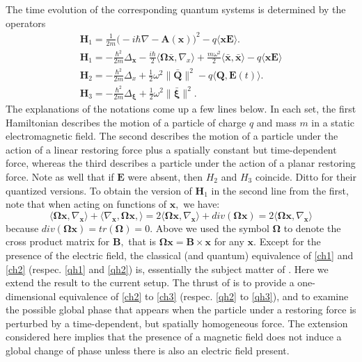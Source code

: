 \documentclass[12pt]{article}
\numberwithin{equation}{section}
\newcommand{\bxi}{{\boldsymbol \xi}}
\newcommand{\bOm}{{\boldsymbol \Omega}}
\def\bA{{\boldsymbol A}}
\def\bB{{\boldsymbol B}}
\def\bE{{\boldsymbol E}}
\def\bQ{{\boldsymbol Q}}
\def\bx{{\boldsymbol x}}
\def\bH{{\boldsymbol H}}
\begin{document}
The time evolution of the corresponding quantum systems is determined by the operators
\begin{gather}
\bH_1 = \frac{1}{2m}\big(-i\hbar\nabla-\bA(\bx)\big)^2 -q\langle\bx\bE\rangle.\nonumber\\
\bH_1 = -\frac{\hbar^2}{2m}\Delta_{\bx} -\frac{i\hbar}{2}\langle\bOm\bar{\bx},\nabla_x\rangle +  \frac{m\omega^2}{2}\langle\bar{\bx},\bar{\bx}\rangle -q\langle\bx\bE\rangle \label{qh1}\\
\bH_2 = -\frac{\hbar^2}{2m}\Delta_x  +\frac{1}{2}\omega^2\|\bar{\bQ}\|^2 - q\langle\bQ,\bE(t)\rangle.\label{qh2}\\
\bH_3  = -\frac{\hbar^2}{2m}\Delta_{\bxi}  +\frac{1}{2}\omega^2\|\bar{\bxi}\|^2.\label{qh3}
\end{gather}
The explanations of the notations come up a few lines below.
In each set, the first Hamiltonian describes the motion of a particle of charge $q$ and mass $m$ in a static electromagnetic field. The second describes the motion of a particle under the action of a linear restoring force plus a spatially constant but time-dependent force, whereas the third describes a particle under the action of a planar restoring force. Note as well that if $\bE$ were absent, then $H_2$ and $H_3$ coincide. Ditto for their quantized versions. To obtain the version of $\bH_1$ in the second line from the first, note that when acting on functions of $\bx, $ we have:
$$\langle\bOm\bx,\nabla_{\bx}\rangle + \langle \nabla_{\bx},\bOm\bx,\rangle = 2\langle\bOm\bx,\nabla_{\bx}\rangle + div(\bOm\bx) = 2\langle\bOm\bx,\nabla_{\bx}\rangle$$
because $div(\bOm\bx)=tr(\bOm)=0.$
Above we used the symbol $\bOm$ to denote the cross product matrix for $\bB,$
 that is $\bOm\bx=\bB\times\bx$ for any $\bx.$ Except for the presence of the electric field, the classical (and quantum) equivalence of \eqref{ch1} and \eqref{ch2} (respec. \eqref{qh1} and \eqref{qh2}) is, essentially the subject matter of \cite{Gz1}. Here we extend the result to the current setup. The thrust of \cite{Gz2} is to provide a one-dimensional equivalence of \eqref{ch2} to \eqref{ch3} (respec. \eqref{qh2} to \eqref{qh3}), and to examine the possible global phase that appears when the particle under a restoring force is perturbed by a time-dependent, but spatially homogeneous force. The extension considered here implies that the presence of a magnetic field does not induce a global change of phase unless there is also an electric field present. 
 
\end{document}

